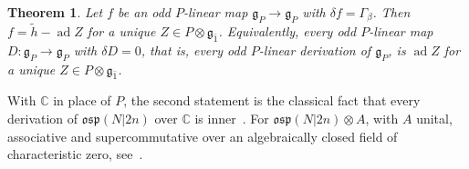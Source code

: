 \documentclass[11pt]{article}
\numberwithin{equation}{section}
\newtheorem{theorem}{Theorem}[section]
\theoremstyle{definition}
\theoremstyle{remark}
\newcommand{\osp}{\mathfrak{osp}}
\newcommand{\ad}{\operatorname{ad}}
\begin{document}
\begin{theorem}\label{thm:all-primitives}
Let $f$ be an odd $P$-linear map $\mathfrak g_P\to\mathfrak g_P$ with $\delta f=\Gamma_\beta$.
Then $f=\tilde h-\ad Z$ for a unique $Z\in P\otimes\mathfrak g_{\bar1}$. Equivalently, every odd
$P$-linear map $D\colon\mathfrak g_P\to\mathfrak g_P$ with $\delta D=0$, that is, every odd $P$-linear
derivation of $\mathfrak g_P$, is $\ad Z$ for a unique $Z\in P\otimes\mathfrak g_{\bar1}$.
\end{theorem}

With $\mathbb C$ in place of $P$, the second statement is the classical fact that every derivation of
$\osp(N|2n)$ over $\mathbb C$ is inner~\cite[Chapter~III, \S1.2, Proposition~3]{Sch79}. For
$\osp(N|2n)\otimes A$, with $A$ unital, associative and supercommutative over an algebraically closed
field of characteristic zero, see~\cite[Corollary~4.13(2)]{Duf02}.
\end{document}
